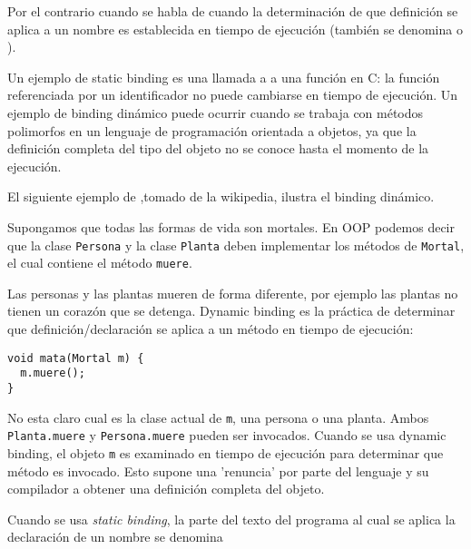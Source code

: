 Por el contrario cuando se habla de  
cuando la determinación de que definición se aplica a un nombre es 
establecida en tiempo de ejecución (también se denomina  o ).

Un ejemplo de static binding es una llamada a a una función en C:
la función referenciada por un identificador no puede cambiarse en tiempo 
de ejecución. Un ejemplo de binding dinámico puede ocurrir cuando se trabaja 
con métodos polimorfos en un lenguaje de programación orientada a objetos, 
ya que la definición completa del tipo del objeto no
se conoce hasta el momento de la ejecución. 

El siguiente ejemplo de ,tomado de la wikipedia,  
ilustra el binding dinámico. 

Supongamos que todas las formas de vida son mortales.
En OOP podemos decir que la clase \verb|Persona| y la clase \verb|Planta| 
deben implementar los métodos de \verb|Mortal|, el cual contiene
el método \verb|muere|.

Las personas y las plantas mueren de forma diferente, por ejemplo las plantas 
no tienen un corazón que se detenga. Dynamic binding
es la práctica de determinar que definición/declaración se aplica 
a un método en tiempo de ejecución:

\begin{verbatim}
void mata(Mortal m) {
  m.muere();
}
\end{verbatim}

No esta claro cual es la clase actual de \verb|m|, una persona o una planta. 
Ambos \verb|Planta.muere| y \verb|Persona.muere| pueden ser invocados.
Cuando se usa dynamic binding, el objeto \verb|m| es examinado en tiempo de 
ejecución para determinar que método es invocado. Esto supone una 'renuncia' por
parte del lenguaje y su compilador a obtener una definición completa del objeto.

\begin{definition}
Cuando se usa \emph{static binding},
la parte del texto del programa al cual se aplica la declaración de un 
nombre se denomina 
\end{definition}

